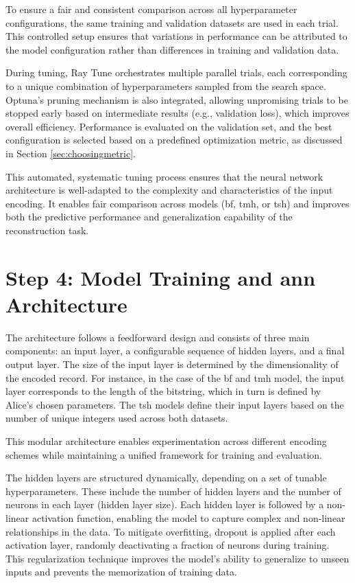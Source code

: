 To ensure a fair and consistent comparison across all hyperparameter configurations, the same training and validation datasets are used in each trial.
This controlled setup ensures that variations in performance can be attributed to the model configuration rather than differences in training and validation data.

During tuning, Ray Tune orchestrates multiple parallel trials, each corresponding to a unique combination of hyperparameters sampled from the search space.
Optuna's pruning mechanism is also integrated, allowing unpromising trials to be stopped early based on intermediate results (e.g., validation loss), which improves overall efficiency.
Performance is evaluated on the validation set, and the best configuration is selected based on a predefined optimization metric, as discussed in Section \ref{sec:choosingmetric}.

This automated, systematic tuning process ensures that the neural network architecture is well-adapted to the complexity and characteristics of the input encoding.
It enables fair comparison across models (\ac{bf}, \ac{tmh}, or \ac{tsh}) and improves both the predictive performance and generalization capability of the reconstruction task.

\section{Step 4: Model Training and \ac{ann} Architecture}

The architecture follows a feedforward design and consists of three main components: an input layer, a configurable sequence of hidden layers, and a final output layer.
The size of the input layer is determined by the dimensionality of the encoded record.
For instance, in the case of the \ac{bf} and \ac{tmh} model, the input layer corresponds to the length of the bitstring, which in turn is defined by Alice’s chosen parameters.
The \ac{tsh} models define their input layers based on the number of unique integers used across both datasets.

This modular architecture enables experimentation across different encoding schemes while maintaining a unified framework for training and evaluation.

The hidden layers are structured dynamically, depending on a set of tunable hyperparameters.
These include the number of hidden layers and the number of neurons in each layer (hidden layer size).
Each hidden layer is followed by a non-linear activation function, enabling the model to capture complex and non-linear relationships in the data.
To mitigate overfitting, dropout is applied after each activation layer, randomly deactivating a fraction of neurons during training.
This regularization technique improves the model's ability to generalize to unseen inputs and prevents the memorization of training data.

